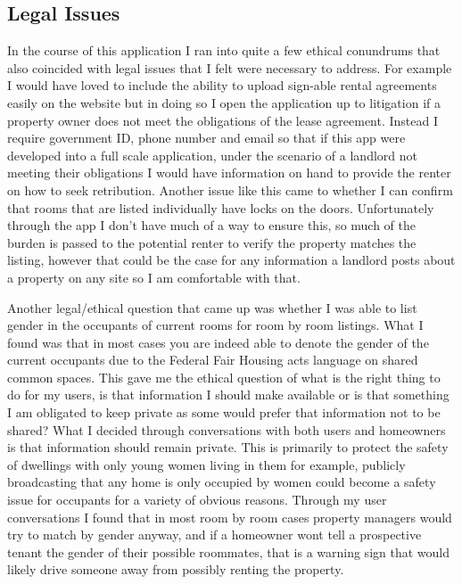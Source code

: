 \documentclass[10pt,twocolumn]{article}
\begin{document}
\subsection{Legal Issues}
In the course of this application I ran into quite a few ethical conundrums that also coincided with legal issues that I felt were necessary to address. For example I would have loved to include the ability to upload sign-able rental agreements easily on the website but in doing so I open the application up to litigation if a property owner does not meet the obligations of the lease agreement. Instead I require government ID, phone number and email so that if this app were developed into a full scale application, under the scenario of a landlord not meeting their obligations I would have information on hand to provide the renter on how to seek retribution. Another issue like this came to whether I can confirm that rooms that are listed individually have locks on the doors. Unfortunately through the app I don't have much of a way to ensure this, so much of the burden is passed to the potential renter to verify the property matches the listing, however that could be the case for any information a landlord posts about a property on any site so I am comfortable with that. 

Another legal/ethical question that came up was whether I was able to list gender in the occupants of current rooms for room by room listings. What I found was that in most cases you are indeed able to denote the gender of the current occupants due to the Federal Fair Housing acts language on shared common spaces.\cite{fairhousingact} This gave me the ethical question of what is the right thing to do for my users, is that information I should make available or is that something I am obligated to keep private as some would prefer that information not to be shared? What I decided through conversations with both users and homeowners is that information should remain private. This is primarily to protect the safety of dwellings with only young women living in them for example, publicly broadcasting that any home is only occupied by women could become a safety issue for occupants for a variety of obvious reasons. Through my user conversations I found that in most room by room cases property managers would try to match by gender anyway, and if a homeowner wont tell a prospective tenant the gender of their possible roommates, that is a warning sign that would likely drive someone away from possibly renting the property. 
\end{document}
